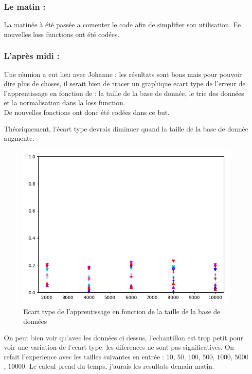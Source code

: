 \subsubsection*{Le matin :}
La matinée à été passée a comenter le code afin de simplifier son utilisation.
Ee nouvelles loss functions ont été codées.


\subsubsection*{L'après midi :}
Une réunion a eut lieu avec Johanne :
les résultats sont bons mais pour pouvoir dire plus de choses, il serait bien de tracer un graphique ecart type de l'erreur de l'apprentissage en fonction de : la taille de la base de donnée, le trie des données et la normalisation dans la loss function.\\
De nouvelles fonctions ont donc été codées dans ce but.

Théoriquement, l'écart type devrais diminuer quand la taille de la base de donnée augmente.

\begin{figure}[H]
    \center
    \includegraphics[height=\grand]{sources/data/etfdata/graph1}
	\caption{Ecart type de l'apprentissage en fonction de la taille de la base de données}
	\label{etfdata1}
\end{figure}
On peut bien voir qu'avec les données ci dessus, l'echantillon est trop petit pour voir une variation de l'ecart type: les diferences ne sont pas significatives.
On refait l'experience avec les tailles suivantes en entrée : $10$, $50$, $100$, $500$, $1000$, $5000$, $10000$.
Le calcul prend du temps, j'aurais les resultats demain matin.

